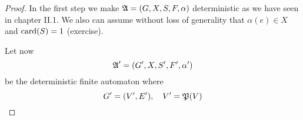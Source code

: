 \begin{proof}
In the first step we make $\mbox{$\mathfrak{A}$} = (G, X, S, F, \alpha)$ deterministic as we
have seen in chapter II.1. We also can assume without loss of generality that
$\alpha(e) \in X$ and $\mathrm{card}({S}) = 1$ (exercise).

Let now
\[ \mbox{$\mathfrak{A}$}' = (G', X, S', F', \alpha') \]
be the deterministic finite automaton where
\[ G'=(V', E'),\quad V' = \mathfrak{P}({V}) \]
\end{proof}









































